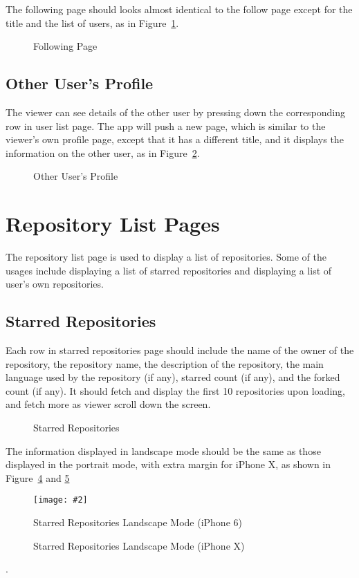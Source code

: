 \documentclass[12pt]{article}
\newcommand{\img}[3]{
\begin{figure}
\begin{center}
\texttt{[image: \#2]}
\caption{#3}\label{#2}
\end{center}
\end{figure}
}
\newcommand{\imgh}[4]{
    \begin{figure}[!htbp]%
    \begin{center}
    \subfloat{{\texttt{[image: \#2]} }}%
    \qquad
    \subfloat{{\texttt{[image: \#3]} }}%
    \caption{#4}\label{#2}
    \end{center}
\end{figure}
}
\begin{document}
The following page should looks almost identical to the follow page except for the title and the list of users, as in Figure~\ref{following}.

\imgh{0.45}{following}{following_iphoneX}{Following Page}

\subsection{Other User's Profile}

The viewer can see details of the other user by pressing down the corresponding row in user list page. The app will push a new page, which is similar to the viewer's own profile page, except that it has a different title, and it displays the information on the other user, as in Figure~\ref{other_user}.

\imgh{0.45}{other_user}{other_user2}{Other User's Profile}


\section{Repository List Pages}

The repository list page is used to display a list of repositories. Some of the usages include displaying a list of starred repositories and displaying a list of user's own repositories.

\subsection{Starred Repositories}

Each row in starred repositories page should include the name of the owner of the repository, the repository name, the description of the repository, the main language used by the repository (if any), starred count (if any), and the forked count (if any). It should fetch and display the first 10 repositories upon loading, and fetch more as viewer scroll down the screen.

\imgh{0.45}{starred_repositories}{starred_repositories_iphoneX}{Starred Repositories}

The information displayed in landscape mode should be the same as those displayed in the portrait mode, with extra margin for iPhone X, as shown in Figure~\ref{landscape_starred} and \ref{landscape_starred_iphoneX}

\img{0.45}{landscape_starred}{Starred Repositories Landscape Mode (iPhone 6)}

\imgh{0.45}{landscape_starred_iphoneX}{landscape_starred_iphoneX_right}{Starred Repositories Landscape Mode (iPhone X)}.
\end{document}
